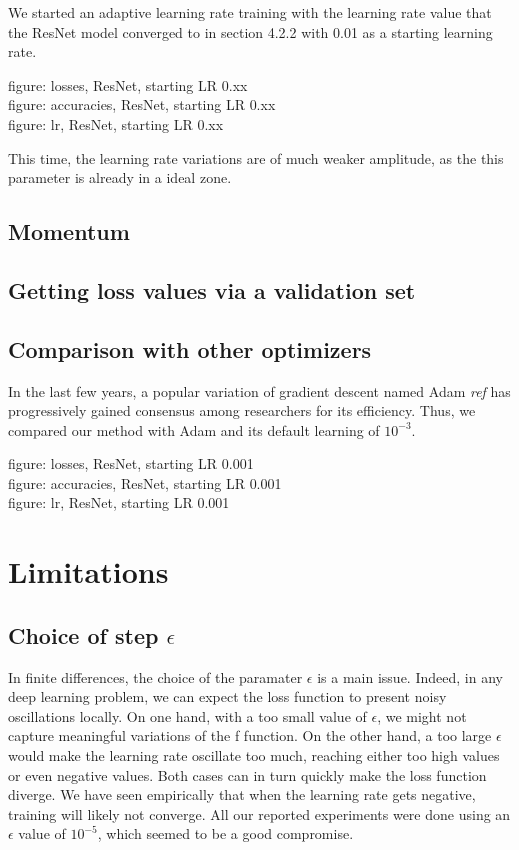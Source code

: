 \documentclass{article}
\begin{document}
  We started an adaptive learning rate training with the learning rate value that the ResNet model converged to in section 4.2.2 with 0.01 as a starting learning rate. 
  
  figure: losses, ResNet, starting LR 0.xx\\
  figure: accuracies, ResNet, starting LR 0.xx\\
  figure: lr, ResNet, starting LR 0.xx
  
  This time, the learning rate variations are of much weaker amplitude, as the this parameter is already in a ideal zone. 
  
  \subsection{Momentum}
  
  \subsection{Getting loss values via a validation set}
  
  \subsection{Comparison with other optimizers}
  
  In the last few years, a popular variation of gradient descent named Adam \emph{ref} has progressively gained consensus among researchers for its efficiency. Thus, we compared our method with Adam and its default learning of $10^{-3}$. 

  figure: losses, ResNet, starting LR 0.001\\
  figure: accuracies, ResNet, starting LR 0.001\\
  figure: lr, ResNet, starting LR 0.001
  
  \section{Limitations}
  
  \subsection{Choice of step $\epsilon$}
  
  In finite differences, the choice of the paramater $\epsilon$ is a main issue. Indeed, in any deep learning problem, we can expect the loss function to present noisy oscillations locally. On one hand, with a too small value of $\epsilon$, we might not capture meaningful variations of the f function. On the other hand, a too large $\epsilon$ would make the learning rate oscillate too much, reaching either too high values or even negative values. Both cases can in turn quickly make the loss function diverge. We have seen empirically that when the learning rate gets negative, training will likely not converge. All our reported experiments were done using an $\epsilon$ value of $10^{-5}$, which seemed to be a good compromise.
  
\end{document}
